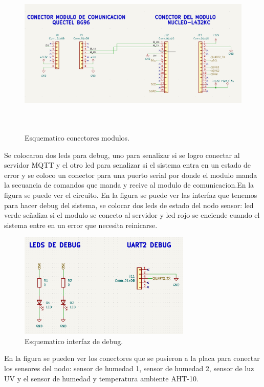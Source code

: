 \begin{figure}[h]
  \centering
	\includegraphics[width=\textwidth, height=8cm]{./Figures/esquematico_modulos.png}
	\caption{Esquematico conectores modulos.}
	\label{fig:esquematico modulos}
\end{figure}

Se colocaron dos leds para debug, uno para senalizar si se logro conectar al servidor MQTT y el otro led para senalizar si el sistema entra en un estado de error y se coloco un conector para una puerto serial por donde el modulo manda la secuancia de comandos que manda y recive al modulo de comunicacion.En la figura se puede ver el circuito.
En la figura se puede ver las interfaz que tenemos para hacer debug del sistema, se colocar dos leds de estado del nodo sensor: led verde señaliza si el modulo se conecto al servidor y led rojo se enciende cuando el sistema entre en un error que necesita reinicarse. 
\begin{figure}[h!]
  \centering
	\includegraphics[width=\textwidth, height=5cm]{./Figures/esquematico_debug.png}
	\caption{Esquematico interfaz de debug.}
	\label{fig:esquematico conectores de debug}
\end{figure}
\clearpage
En la figura se pueden ver los conectores que se pusieron a la placa para conectar los sensores del nodo: sensor de humedad 1, sensor de humedad 2, sensor de luz UV y el sensor de humedad y temperatura ambiente AHT-10.

